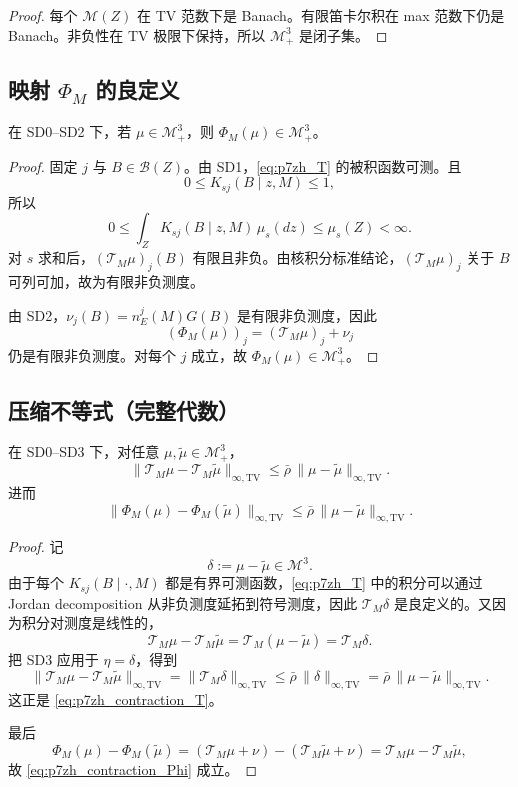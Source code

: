 \begin{proof}
每个 $\mathcal M(Z)$ 在 TV 范数下是 Banach。有限笛卡尔积在 max 范数下仍是 Banach。非负性在 TV 极限下保持，所以 $\mathcal M_+^3$ 是闭子集。
\end{proof}

\subsection{映射 $\Phi_M$ 的良定义}

\begin{lemma}[良定义]
在 SD0--SD2 下，若 $\mu\in\mathcal M_+^3$，则 $\Phi_M(\mu)\in\mathcal M_+^3$。
\end{lemma}

\begin{proof}
固定 $j$ 与 $B\in\mathcal B(Z)$。由 SD1，\eqref{eq:p7zh_T} 的被积函数可测。且
\[
0\le K_{sj}(B\mid z,M)\le1,
\]
所以
\[
0\le\int_Z K_{sj}(B\mid z,M)\,\mu_s(dz)\le\mu_s(Z)<\infty.
\]
对 $s$ 求和后，$(\mathcal T_M\mu)_j(B)$ 有限且非负。由核积分标准结论，$(\mathcal T_M\mu)_j$ 关于 $B$ 可列可加，故为有限非负测度。

由 SD2，$\nu_j(B)=n_E^j(M)G(B)$ 是有限非负测度，因此
\[
(\Phi_M(\mu))_j=(\mathcal T_M\mu)_j+\nu_j
\]
仍是有限非负测度。对每个 $j$ 成立，故 $\Phi_M(\mu)\in\mathcal M_+^3$。
\end{proof}

\subsection{压缩不等式（完整代数）}

\begin{lemma}[在位算子的压缩性]
在 SD0--SD3 下，对任意 $\mu,\tilde\mu\in\mathcal M_+^3$，
\begin{equation}
\|\mathcal T_M\mu-\mathcal T_M\tilde\mu\|_{\infty,\mathrm{TV}}
\le\bar\rho\,\|\mu-\tilde\mu\|_{\infty,\mathrm{TV}}.
\label{eq:p7zh_contraction_T}
\end{equation}
进而
\begin{equation}
\|\Phi_M(\mu)-\Phi_M(\tilde\mu)\|_{\infty,\mathrm{TV}}
\le\bar\rho\,\|\mu-\tilde\mu\|_{\infty,\mathrm{TV}}.
\label{eq:p7zh_contraction_Phi}
\end{equation}
\end{lemma}

\begin{proof}
记
\[
\delta:=\mu-\tilde\mu\in\mathcal M^3.
\]
由于每个 $K_{sj}(B\mid\cdot,M)$ 都是有界可测函数，\eqref{eq:p7zh_T} 中的积分可以通过 Jordan decomposition 从非负测度延拓到符号测度，因此 $\mathcal T_M\delta$ 是良定义的。又因为积分对测度是线性的，
\[
\mathcal T_M\mu-\mathcal T_M\tilde\mu
=
\mathcal T_M(\mu-\tilde\mu)
=
\mathcal T_M\delta.
\]
把 SD3 应用于 $\eta=\delta$，得到
\[
\|\mathcal T_M\mu-\mathcal T_M\tilde\mu\|_{\infty,\mathrm{TV}}
=
\|\mathcal T_M\delta\|_{\infty,\mathrm{TV}}
\le
\bar\rho\,\|\delta\|_{\infty,\mathrm{TV}}
=
\bar\rho\,\|\mu-\tilde\mu\|_{\infty,\mathrm{TV}}.
\]
这正是 \eqref{eq:p7zh_contraction_T}。

最后
\[
\Phi_M(\mu)-\Phi_M(\tilde\mu)
=(\mathcal T_M\mu+\nu)-(\mathcal T_M\tilde\mu+\nu)
=\mathcal T_M\mu-\mathcal T_M\tilde\mu,
\]
故 \eqref{eq:p7zh_contraction_Phi} 成立。
\end{proof}

